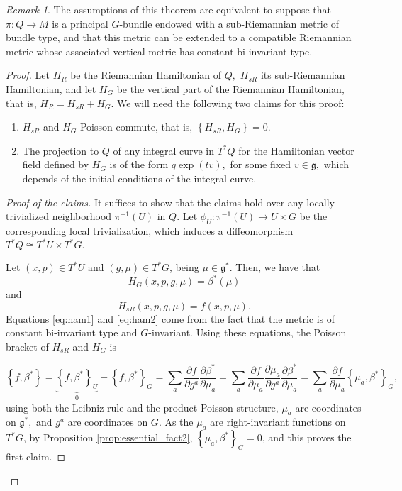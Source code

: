 \documentclass[12pt, letterpaper, reqno]{amsart}
\theoremstyle{definition}
\theoremstyle{plain}
\theoremstyle{remark}
\newtheorem{rem}{Remark}
\begin{document}
\begin{rem}
The assumptions of this theorem are equivalent to suppose that $ \pi: Q \rightarrow  M $ is a principal $ G $-bundle endowed with a sub-Riemannian metric of bundle type, and that this metric can be extended to a compatible Riemannian metric whose associated vertical metric has constant bi-invariant type.	
\end{rem}
\begin{proof}
	Let $ H_R $ be the Riemannian Hamiltonian of $ Q, $ $ H_{sR} $ its sub-Riemannian Hamiltonian, and let $ H_G$ be the vertical part of the Riemannian Hamiltonian, that is, $ H_R = H_{sR}+H_G. $  We will need the following two claims for this proof:
	\begin{enumerate}
		\item $ H_{sR} $ and $ H_G $ Poisson-commute, that is, $ \left\{ H_{sR}, H_G \right\} =0. $ 
		\item The projection to $ Q $ of any integral curve in $ T^*Q $ for the Hamiltonian vector field defined by $ H_G $ is of the form $ q \operatorname{exp}(tv),  $ for some fixed $ v\in \mathfrak{g}, $ which depends of the initial conditions of the integral curve.
	\end{enumerate}
	\begin{proof}
		[Proof of the claims] It suffices to show that the claims hold over any locally trivialized neighborhood $ \pi^{-1}(U) $ in $ Q. $ Let $ \phi_U: \pi^{-1}(U) \rightarrow U\times G $ be the corresponding local trivialization, which induces a diffeomorphism $ T^*Q \cong T^*U\times T^*G.$

		Let $ (x,p)\in T^* U $ and $ (g,\mu)\in T^*G $, being $ \mu\in \mathfrak{g}^*. $ Then, we have that
		\begin{equation}\label{eq:ham1}
			H_G(x,p,g,\mu) = \beta^*(\mu)
		\end{equation}
		and
		\begin{equation}\label{eq:ham2}
			H_{sR}(x,p,g,\mu)= f(x,p,\mu).	
		\end{equation}
		Equations \eqref{eq:ham1} and \eqref{eq:ham2} come from the fact that the metric is of constant bi-invariant type and $ G $-invariant. Using these equations, the Poisson bracket of $ H_{sR} $ and $ H_{G} $ is

		$$ \left\{ f,\beta^* \right\} = \underbrace{\left\{ f,\beta^* \right\}_U}_0 + \left\{ f,\beta^* \right\}_G = \sum^{}_{a} \frac{\partial f}{\partial g^a} \frac{\partial \beta^*}{\partial \mu_a} = \sum^{}_{a} \frac{\partial f}{\partial \mu_a} \frac{\partial \mu_a}{\partial g^a} \frac{\partial \beta^*}{\partial \mu_a}  = \sum^{}_{a} \frac{\partial f}{\partial \mu_a} \left\{ \mu_a, \beta^* \right\}_G, $$ 
		using both the Leibniz rule and the product Poisson structure, $ \mu_a $ are coordinates on $ \mathfrak{g}^*, $ and $ g^a $ are coordinates on $ G. $ As the $ \mu_a $ are right-invariant functions on $ T^*G$, by Proposition \ref{prop:essential_fact2}, $ \left\{ \mu_a,\beta^* \right\}_G =0 $, and this proves the first claim.


\end{proof}
\end{proof}
\end{document}
